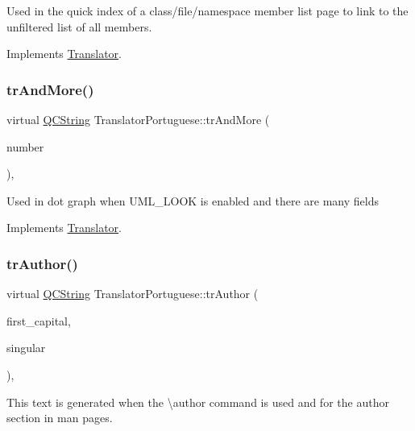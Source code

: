Used in the quick index of a class/file/namespace member list page to link to the unfiltered list of all members. 

Implements \mbox{\hyperlink{class_translator}{Translator}}.

\mbox{\label{class_translator_portuguese_a06f4476ad36b69307e44d514eef89c8f}} 
\subsubsection{\texorpdfstring{trAndMore()}{trAndMore()}}
{\footnotesize\ttfamily virtual \mbox{\hyperlink{class_q_c_string}{Q\+C\+String}} Translator\+Portuguese\+::tr\+And\+More (\begin{DoxyParamCaption}\item[{const \mbox{\hyperlink{class_q_c_string}{Q\+C\+String}} \&}]{number }\end{DoxyParamCaption})\hspace{0.3cm}{\ttfamily [inline]}, {\ttfamily [virtual]}}

Used in dot graph when U\+M\+L\+\_\+\+L\+O\+OK is enabled and there are many fields 

Implements \mbox{\hyperlink{class_translator}{Translator}}.

\mbox{\label{class_translator_portuguese_a9eb5a895d51570ce368e064746a6cc14}} 
\subsubsection{\texorpdfstring{trAuthor()}{trAuthor()}}
{\footnotesize\ttfamily virtual \mbox{\hyperlink{class_q_c_string}{Q\+C\+String}} Translator\+Portuguese\+::tr\+Author (\begin{DoxyParamCaption}\item[{bool}]{first\+\_\+capital,  }\item[{bool}]{singular }\end{DoxyParamCaption})\hspace{0.3cm}{\ttfamily [inline]}, {\ttfamily [virtual]}}

This text is generated when the \textbackslash{}author command is used and for the author section in man pages. 

